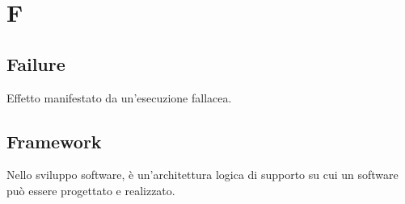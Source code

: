 \section*{F}

\subsection{Failure}
Effetto manifestato da un'esecuzione fallacea.

\subsection{Framework}
Nello sviluppo software, è un'architettura logica di supporto su cui un software può essere progettato e realizzato.